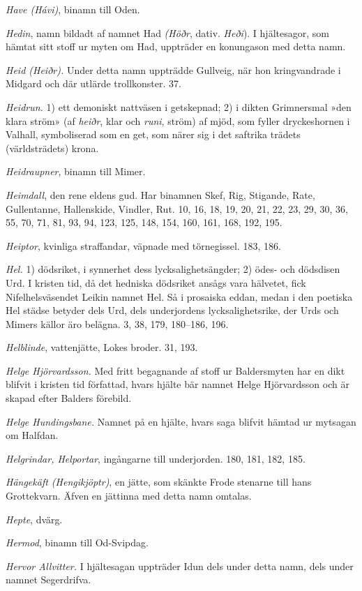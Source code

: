 \emph{Have (Hávi)}, binamn till Oden.

\emph{Hedin}, namn bildadt af namnet Had \emph{(Höðr}, dativ.
\emph{Heði}). I hjältesagor, som hämtat sitt stoff ur myten om Had,
uppträder en konungason med detta namn.

\emph{Heid (Heiðr).} Under detta namn uppträdde Gullveig, när hon
kringvandrade i Midgard och där utlärde trollkonster. 37.

\emph{Heidrun.} 1) ett demoniskt nattväsen i getskepnad; 2) i dikten
Grimnersmal »den klara ström» (af \emph{heiðr}, klar och \emph{runi},
ström) af mjöd, som fyller dryckeshornen i Valhall, symboliserad som en
get, som närer sig i det saftrika trädets (världsträdets) krona.

\emph{Heidraupner}, binamn till Mimer.

\emph{Heimdall}, den rene eldens gud. Har binamnen Skef, Rig, Stigande,
Rate, Gullentanne, Hallenskide, Vindler, Rut. 10, 16, 18, 19, 20, 21,
22, 23, 29, 30, 36, 55, 70, 71, 81, 93, 94, 123, 125, 148, 154, 160,
161, 168, 192, 195.

\emph{Heiptor}, kvinliga straffandar, väpnade med törnegissel. 183, 186.

\emph{Hel.} 1) dödsriket, i synnerhet dess lycksalighetsängder; 2) ödes-
och dödsdisen Urd. I kristen tid, då det hedniska dödsriket ansågs vara
hälvetet, fick Nifelhelsväsendet Leikin namnet Hel. Så i prosaiska
eddan, medan i den poetiska Hel städse betyder dels Urd, dels
underjordens lycksalighetsrike, der Urds och Mimers källor äro belägna.
3, 38, 179, 180--186, 196.

\emph{Helblinde}, vattenjätte, Lokes broder. 31, 193.

\emph{Helge Hjörvardsson.} Med fritt begagnande af stoff ur Baldersmyten
har en dikt blifvit i kristen tid författad, hvars hjälte bär namnet
Helge Hjörvardsson och är skapad efter Balders förebild.

\emph{Helge Hundingsbane.} Namnet på en hjälte, hvars saga blifvit
hämtad ur mytsagan om Halfdan.

\emph{Helgrindar, Helportar}, ingångarne till underjorden. 180, 181,
182, 185.

\emph{Hängekäft (Hengikjöptr)}, en jätte, som skänkte Frode stenarne
till hans Grottekvarn. Äfven en jättinna med detta namn omtalas.

\emph{Hepte}, dvärg.

\emph{Hermod}, binamn till Od-Svipdag.

\emph{Hervor Allvitter.} I hjältesagan uppträder Idun dels under detta
namn, dels under namnet Segerdrifva.

